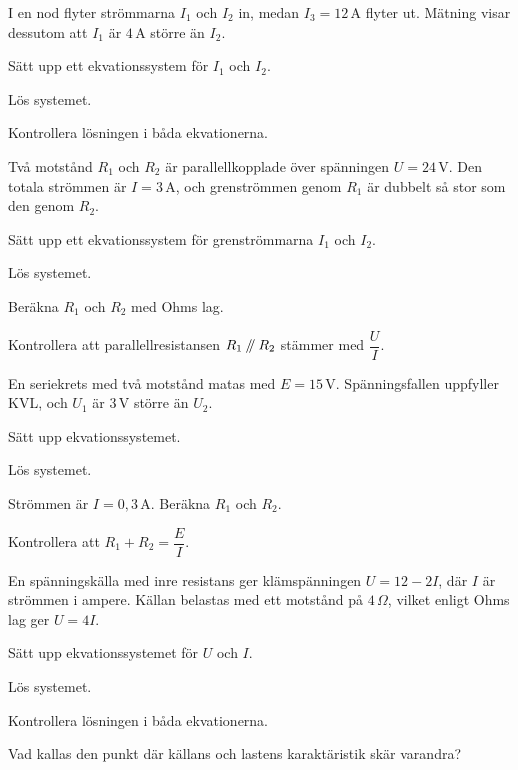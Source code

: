 I en nod flyter strömmarna $I_1$ och $I_2$ in, medan $I_3 = 12\,\text{A}$ flyter ut. Mätning visar
dessutom att $I_1$ är $4\,\text{A}$ större än $I_2$.
\begin{parts}
  \item Sätt upp ett ekvationssystem för $I_1$ och $I_2$.
  \item Lös systemet.
  \item Kontrollera lösningen i båda ekvationerna.
\end{parts}

Två motstånd $R_1$ och $R_2$ är parallellkopplade över spänningen $U = 24\,\text{V}$. Den totala
strömmen är $I = 3\,\text{A}$, och grenströmmen genom $R_1$ är dubbelt så stor som den genom
$R_2$.
\begin{parts}
  \item Sätt upp ett ekvationssystem för grenströmmarna $I_1$ och $I_2$.
  \item Lös systemet.
  \item Beräkna $R_1$ och $R_2$ med Ohms lag.
  \item Kontrollera att parallellresistansen $R_1 \mathbin{/\mkern-5mu/} R_2$ stämmer med $\dfrac{U}{I}$.
\end{parts}

En seriekrets med två motstånd matas med $E = 15\,\text{V}$. Spänningsfallen uppfyller KVL, och
$U_1$ är $3\,\text{V}$ större än $U_2$.
\begin{parts}
  \item Sätt upp ekvationssystemet.
  \item Lös systemet.
  \item Strömmen är $I = 0{,}3\,\text{A}$. Beräkna $R_1$ och $R_2$.
  \item Kontrollera att $R_1 + R_2 = \dfrac{E}{I}$.
\end{parts}

En spänningskälla med inre resistans ger klämspänningen $U = 12 - 2I$, där $I$ är strömmen i
ampere. Källan belastas med ett motstånd på $4\,\Omega$, vilket enligt Ohms lag ger $U = 4I$.
\begin{parts}
  \item Sätt upp ekvationssystemet för $U$ och $I$.
  \item Lös systemet.
  \item Kontrollera lösningen i båda ekvationerna.
  \item Vad kallas den punkt där källans och lastens karaktäristik skär varandra?
\end{parts}

